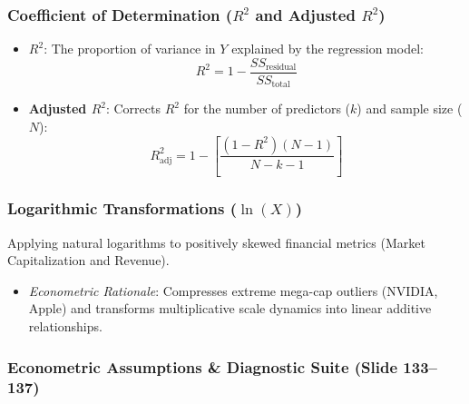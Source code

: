 \documentclass[
]{article}
\providecommand{\tightlist}{%
  \setlength{\itemsep}{0pt}\setlength{\parskip}{0pt}}
\begin{document}
\subsubsection{\texorpdfstring{Coefficient of Determination (\(R^2\) and
Adjusted
\(R^2\))}{Coefficient of Determination (R\^{}2 and Adjusted R\^{}2)}}\label{coefficient-of-determination-r2-and-adjusted-r2}

\begin{itemize}
\tightlist
\item
  \textbf{\(R^2\)}: The proportion of variance in \(Y\) explained by the
  regression model:
  \[R^2 = 1 - \frac{SS_{\text{residual}}}{SS_{\text{total}}}\]
\item
  \textbf{Adjusted \(R^2\)}: Corrects \(R^2\) for the number of
  predictors (\(k\)) and sample size (\(N\)):
  \[R_{\text{adj}}^2 = 1 - \left[\frac{(1 - R^2)(N - 1)}{N - k - 1}\right]\]
\end{itemize}

\subsubsection{\texorpdfstring{Logarithmic Transformations
(\(\ln(X)\))}{Logarithmic Transformations (\textbackslash ln(X))}}\label{logarithmic-transformations-lnx}

Applying natural logarithms to positively skewed financial metrics
(Market Capitalization and Revenue).

\begin{itemize}
\tightlist
\item
  \emph{Econometric Rationale}: Compresses extreme mega-cap outliers
  (NVIDIA, Apple) and transforms multiplicative scale dynamics into
  linear additive relationships.
\end{itemize}

\subsubsection{Econometric Assumptions \& Diagnostic Suite (Slide
133--137)}\label{econometric-assumptions-diagnostic-suite-slide-133137}
\end{document}
